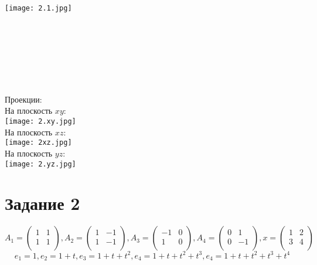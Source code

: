 \documentclass{article}
\begin{document}
    \texttt{[image: 2.1.jpg]} \\ \\ \\ \\ \\ \\ \\ \\
    Проекции: \\
    На плоскость $xy$: \\
    \texttt{[image: 2.xy.jpg]} \\
    На плоскость $xz$: \\
    \texttt{[image: 2xz.jpg]} \\
    На плоскость $yz$: \\
    \texttt{[image: 2.yz.jpg]} \\
    
    
    

    
\newpage
    \section{Задание 2}
    \[
    A_1 =
    \begin{pmatrix}
        1 & 1 \\
        1 & 1 \\
    \end{pmatrix},
    A_2 =
    \begin{pmatrix}
        1 & -1 \\
        1 & -1 \\
    \end{pmatrix},
    A_3 =
    \begin{pmatrix}
        -1 & 0 \\
        1 & 0 \\
    \end{pmatrix},
    A_4 =
    \begin{pmatrix}
        0 & 1 \\
        0 & -1 \\
    \end{pmatrix},
    x =
    \begin{pmatrix}
        1 & 2 \\
        3 & 4 \\
    \end{pmatrix}
    \]
    \[
    e_1 = 1, e_2 = 1 + t, e_3 = 1 + t + t^2, e_4 = 1 + t + t^2 + t^3, e_4 = 1 + t + t^2 + t^3 + t^4  
    \]
\end{document}
